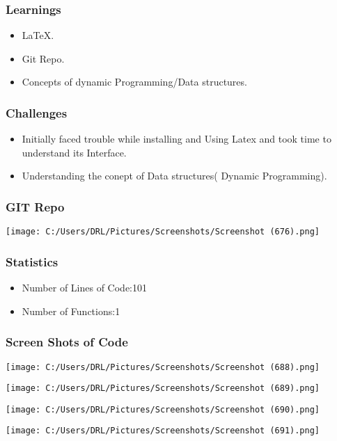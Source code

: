 \documentclass{beamer}
\begin{document}
    \begin{frame}
        \frametitle{Learnings}
	\begin{itemize}
	    \item LaTeX.
	    \item Git Repo.
	    \item Concepts of dynamic Programming/Data structures.
	 \end{itemize}
    \end{frame}
    \begin{frame}
	\frametitle{Challenges}
        \begin{itemize}
	    \item Initially faced trouble while installing and Using Latex and took time to understand its Interface.
	    \item Understanding the conept of Data structures( Dynamic Programming).
	   
        \end{itemize}
   \end{frame}
    \begin{frame}
	\frametitle{GIT Repo}
	
     \centerline{\texttt{[image: C:/Users/DRL/Pictures/Screenshots/Screenshot (676).png]}}

    \end{frame}
    \begin{frame}
	\frametitle{Statistics}
        \begin{itemize}
	     \item Number of Lines of Code:101
	     \item Number of Functions:1
        \end{itemize}
    \end{frame}
    \begin{frame}
	\frametitle{Screen Shots of Code} 
	     \centerline{\texttt{[image: C:/Users/DRL/Pictures/Screenshots/Screenshot (688).png]}}
	
    \end{frame}
    \begin{frame}
      \centerline {\texttt{[image: C:/Users/DRL/Pictures/Screenshots/Screenshot (689).png]}}
    \end{frame}
    \begin{frame}
      \centerline{\texttt{[image: C:/Users/DRL/Pictures/Screenshots/Screenshot (690).png]}}
    \end{frame}
    \begin{frame}
       \centerline{\texttt{[image: C:/Users/DRL/Pictures/Screenshots/Screenshot (691).png]}}
    \end{frame}
\end{document}

